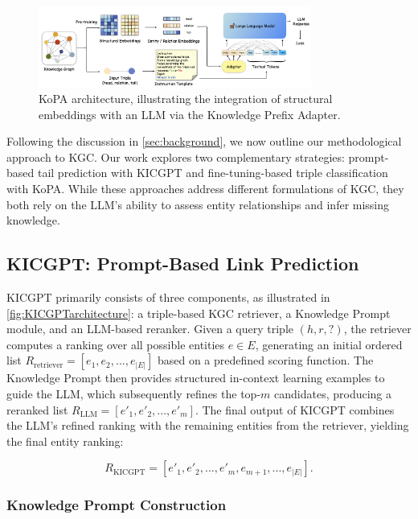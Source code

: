 \documentclass[12pt,a4paper]{article}
\begin{document}
\begin{figure}
    \centering
    \includegraphics[width=0.8\textwidth]{figures/KoPAarchitecture}
    \caption{KoPA architecture, illustrating the integration of structural embeddings with an LLM via the Knowledge Prefix Adapter.}
    \label{fig:KoPAarchitecture}
\end{figure}

Following the discussion in \cref{sec:background}, we now outline our methodological approach to KGC.
Our work explores two complementary strategies: prompt-based tail prediction with KICGPT and fine-tuning-based triple classification with KoPA.
While these approaches address different formulations of KGC, they both rely on the LLM’s ability to assess entity relationships and infer missing knowledge.

\subsection{KICGPT: Prompt-Based Link Prediction}
\label{sec:method:kicgpt}

KICGPT primarily consists of three components, as illustrated in \cref{fig:KICGPTarchitecture}: a triple-based KGC retriever, a Knowledge Prompt module, and an LLM-based reranker. Given a query triple \( (h, r, ?) \), the retriever computes a ranking over all possible entities \( e \in E \), generating an initial ordered list \( R_{\text{retriever}} = [e_1, e_2, ..., e_{|E|}] \) based on a predefined scoring function. The Knowledge Prompt then provides structured in-context learning examples to guide the LLM, which subsequently refines the top-\( m \) candidates, producing a reranked list \( R_{\text{LLM}} = [e'_1, e'_2, ..., e'_m] \).
The final output of KICGPT combines the LLM’s refined ranking with the remaining entities from the retriever, yielding the final entity ranking:

\[
    R_{\text{KICGPT}} = [e'_1, e'_2, ..., e'_m, e_{m+1}, ..., e_{|E|}].
\]

\subsubsection{Knowledge Prompt Construction}
\end{document}
